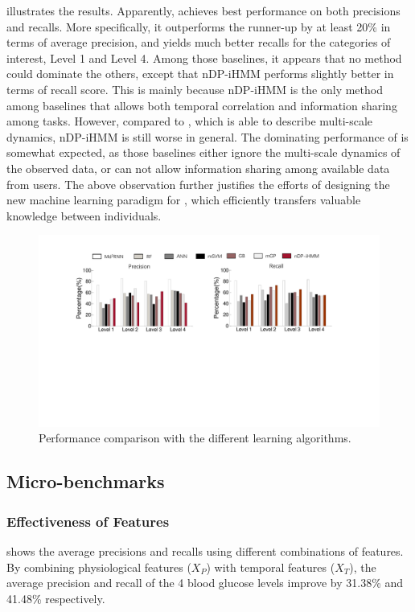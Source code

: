 { illustrates the results.
Apparently, \modelname achieves best performance on both precisions and recalls.
More specifically, it outperforms the runner-up by at least 20\% in terms of average precision, and yields much better recalls for the categories of interest, \ie Level 1 and Level 4.
Among those baselines, it appears that no method could dominate the others, except that nDP-iHMM performs slightly better in terms of recall score.
This is mainly because nDP-iHMM is the only method among baselines that allows both temporal correlation and information sharing among tasks.
However, compared to \modelname, which is able to describe multi-scale dynamics, nDP-iHMM is still worse in general.
The dominating performance of \modelname is somewhat expected, as those baselines either ignore the multi-scale dynamics of the observed data, or can not allow information sharing among available data from users.
The above observation further justifies the efforts of designing the new machine learning paradigm for \sysname, which efficiently transfers valuable knowledge between individuals.
}
\begin{figure}[h]
  \centering
  \includegraphics[width=0.8\columnwidth]{./img/Model_CMP1.pdf}
  \caption{Performance comparison with the different learning algorithms.}
  \label{fig:cmp_models}
\end{figure}


\subsection{Micro-benchmarks}
\subsubsection{Effectiveness of Features}
 shows the average precisions and recalls using different combinations of features.
By combining physiological features ($X_{P}$) with temporal features ($X_{T}$), the average precision and recall of the 4 blood glucose levels improve by 31.38\% and 41.48\% respectively.

